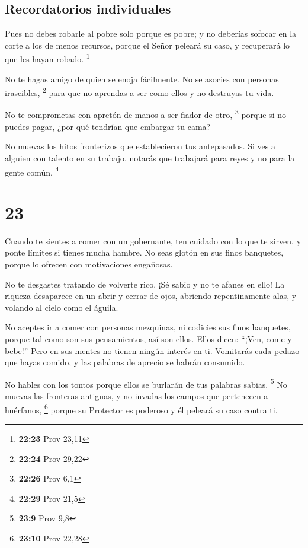 \hypertarget{recordatorios-individuales}{%
\subsection{Recordatorios
individuales}\label{recordatorios-individuales}}

 Pues no debes robarle al pobre solo porque es pobre; y no
deberías sofocar en la corte a los de menos recursos, 
porque el Señor peleará su caso, y recuperará lo que les hayan robado.
\footnote{\textbf{22:23} Prov 23,11}

 No te hagas amigo de quien se enoja fácilmente. No se
asocies con personas irascibles, \footnote{\textbf{22:24} Prov 29,22}
 para que no aprendas a ser como ellos y no destruyas tu
vida.

 No te comprometas con apretón de manos a ser fiador de
otro, \footnote{\textbf{22:26} Prov 6,1}  porque si no
puedes pagar, ¿por qué tendrían que embargar tu cama?

 No muevas los hitos fronterizos que establecieron tus
antepasados.  Si ves a alguien con talento en su trabajo,
notarás que trabajará para reyes y no para la gente común. \footnote{\textbf{22:29}
  Prov 21,5}

\hypertarget{section-22}{%
\section{23}\label{section-22}}

 Cuando te sientes a comer con un gobernante, ten cuidado
con lo que te sirven,  y ponte límites si tienes mucha
hambre.  No seas glotón en sus finos banquetes, porque lo
ofrecen con motivaciones engañosas.

 No te desgastes tratando de volverte rico. ¡Sé sabio y no
te afanes en ello!  La riqueza desaparece en un abrir y
cerrar de ojos, abriendo repentinamente alas, y volando al cielo como el
águila.

 No aceptes ir a comer con personas mezquinas, ni codicies
sus finos banquetes,  porque tal como son sus pensamientos,
así son ellos. Ellos dicen: ``¡Ven, come y bebe!'' Pero en sus mentes no
tienen ningún interés en ti.  Vomitarás cada pedazo que
hayas comido, y las palabras de aprecio se habrán consumido.

 No hables con los tontos porque ellos se burlarán de tus
palabras sabias. \footnote{\textbf{23:9} Prov 9,8}  No
muevas las fronteras antiguas, y no invadas los campos que pertenecen a
huérfanos, \footnote{\textbf{23:10} Prov 22,28}  porque su
Protector es poderoso y él peleará su caso contra ti.

